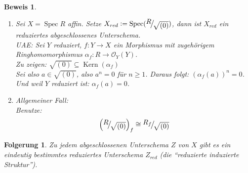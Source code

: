 \documentclass[a4paper,oneside]{scrbook}
\theoremstyle{break}
\newtheorem{Folg}[Def]{Folgerung}
\theoremstyle{nonumberbreak}
\theoremstyle{nonumberplain}
\newtheorem{Bew}{Beweis}
\theoremstyle{break}
\newcommand{\defeqr}[0]{\mathrel{\mathop:}=}
\newcommand{\Spec}{%
	\ensuremath{\operatorname{Spec}}%
}
\DeclareMathOperator{\Kern}{Kern}
\newcommand{\FakRaum}[2]{
  \raisebox{0.7ex}{\ensuremath{#1}}
  \ensuremath{\mkern-3mu}\big/\ensuremath{\mkern-3mu}
  \raisebox{-0.6ex}{\ensuremath{#2}}}
\begin{document}
\begin{Bew}
  \begin{enumerate}
  \item[(1)]   Sei $X=\Spec R$ affin. Setze $X_{red}\defeqr\Spec(\FakRaum{R}{\sqrt{(0)}})$, dann ist $X_{red}$ 
    ein reduziertes abgeschlossenes Unterschema. \\
    UAE: Sei $Y$ reduziert, $f:Y\to X$ ein Morphismus mit zugehörigem Ringhomomorphismus $\alpha_f:R\to\mathcal O_Y(Y)$. \\
    Zu zeigen: $\sqrt{(0)}\subseteq\Kern(\alpha_f)$ \\
    Sei also $a\in\sqrt{(0)}$, also $a^n=0$ für $n\geq 1$. Daraus folgt: $(\alpha_f(a))^n=0$. Und weil $Y$ reduziert ist: $\alpha_f(a)=0$.
  \item[(2)] Allgemeiner Fall: \\
    Benutze:
    \begin{align*}
      \left( \FakRaum{R}{\sqrt{(0)}}\right)_f\cong\FakRaum{R_f}{\sqrt{(0)}}
    \end{align*}
  \end{enumerate}
\end{Bew}

\begin{Folg}
  \label{folg:6.5}
  Zu jedem abgeschlossenen Unterschema $Z$ von $X$ gibt es ein eindeutig bestimmtes reduziertes Unterschema $Z_{red}$
  (die ``reduzierte induzierte Struktur'').
\end{Folg}
\end{document}
